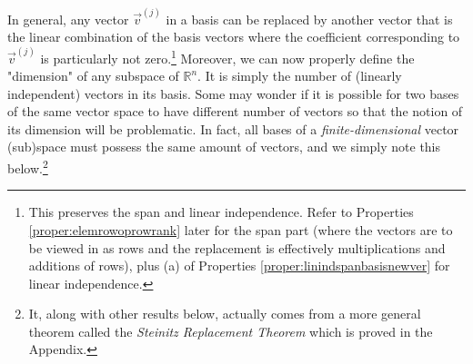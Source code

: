 In general, any vector $\vec{v}^{(j)}$ in a basis can be replaced by another vector that is the linear combination of the basis vectors where the coefficient corresponding to $\vec{v}^{(j)}$ is particularly not zero.\footnote{\label{foot:ft14}This preserves the span and linear independence. Refer to Properties \ref{proper:elemrowoprowrank} later for the span part (where the vectors are to be viewed in as rows and the replacement is effectively multiplications and additions of rows), plus (a) of Properties \ref{proper:linindspanbasisnewver} for linear independence.} Moreover, we can now properly define the "dimension" of any subspace of $\mathbb{R}^n$. It is simply the number of (linearly independent) vectors in its basis. Some may wonder if it is possible for two bases of the same vector space to have different number of vectors so that the notion of its dimension will be problematic. In fact, all bases of a \textit{finite-dimensional} vector (sub)space must possess the same amount of vectors, and we simply note this below.\footnote{It, along with other results below, actually comes from a more general theorem called the \textit{Steinitz Replacement Theorem} which is proved in the Appendix.} %

